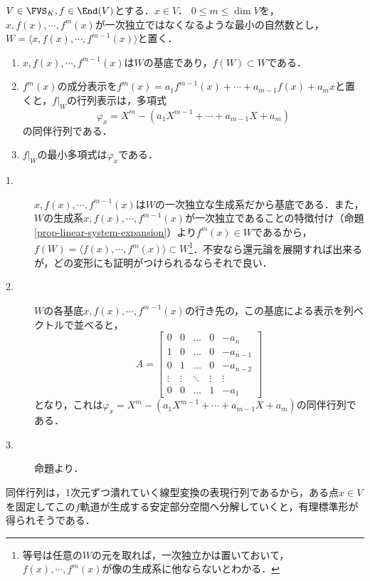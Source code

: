 \documentclass[uplatex, dvipdfmx]{jsreport}
\begin{document}
\begin{proposition}[安定部分空間上の最小多項式]\label{prop-stable-subspace}
    $V\in\FVS_K,f\in\End(V)$とする．$x\in V$．
    $0\le m\le\dim V$を，$x,f(x),\cdots,f^m(x)$が一次独立ではなくなるような最小の自然数とし，$W=\langle x,f(x),\cdots,f^{m-1}(x)\rangle$と置く．
    \begin{enumerate}
        \item $x,f(x),\cdots,f^{m-1}(x)$は$W$の基底であり，$f(W)\subset W$である．
        \item $f^m(x)$の成分表示を$f^m(x)=a_1f^{m-1}(x)+\cdots+a_{m-1}f(x)+a_mx$と置くと，$f|_W$の行列表示は，多項式
        \[ \varphi_x=X^m-(a_1X^{m-1}+\cdots+a_{m-1}X+a_m) \]
        の同伴行列である．
        \item $f|_W$の最小多項式は$\varphi_x$である．
    \end{enumerate}
\end{proposition}
\begin{Proof}\mbox{}
    \begin{description}
        \item[1.] $x,f(x),\cdots,f^{m-1}(x)$は$W$の一次独立な生成系だから基底である．また，$W$の生成系$x,f(x),\cdots,f^{m-1}(x)$が一次独立であることの特徴付け（命題\ref{prop-linear-system-expansion}）より$f^m(x)\in W$であるから，$f(W)=\langle f(x),\cdots,f^m(x)\rangle\subset W$\footnote{等号は任意の$W$の元を取れば，一次独立かは置いておいて，$f(x),\cdots,f^m(x)$が像の生成系に他ならないとわかる．}．不安なら還元論を展開すれば出来るが，どの変形にも証明がつけられるならそれで良い．
        \item[2.] $W$の各基底$x,f(x),\cdots,f^{m-1}(x)$の行き先の，この基底による表示を列ベクトルで並べると，
        \[A=\begin{bmatrix}
            0 & 0 & \dots & 0 & -a_n \\
            1 & 0 & \dots & 0 & -a_{n-1} \\
            0 & 1 & \dots & 0 & -a_{n-2} \\
            \vdots & \vdots & \ddots & \vdots & \vdots \\
            0 & 0 & \dots & 1 & -a_1
            \end{bmatrix}\]
        となり，これは$\varphi_x=X^m-(a_1X^{m-1}+\cdots+a_{m-1}X+a_m)$の同伴行列である．
        \item[3.] 命題より．
    \end{description}
\end{Proof}
\begin{remarks}
    同伴行列は，1次元ずつ潰れていく線型変換の表現行列であるから，ある点$x\in V$を固定してこの$f$軌道が生成する安定部分空間へ分解していくと，有理標準形が得られそうである．
\end{remarks}
\end{document}
